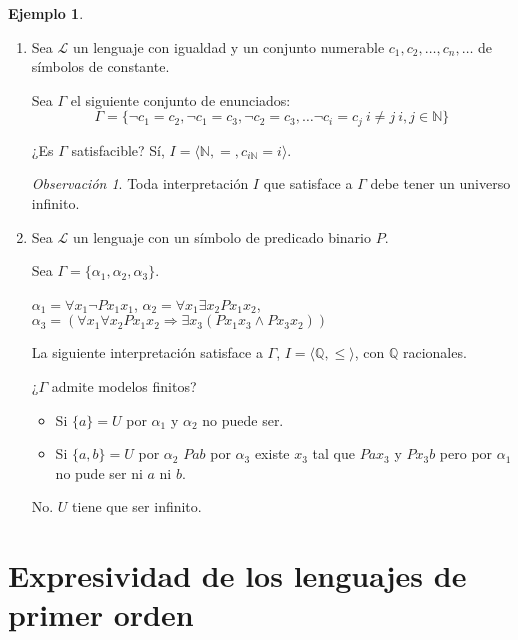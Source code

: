\documentclass[a4paper,11pt]{article}
\theoremstyle{definition}
\newtheorem{exap}{Ejemplo}[section]
\theoremstyle{remark}
\newtheorem*{remk}{Observación}
\def\NN{\mathbb{N}}
\def\QQ{\mathbb{Q}}
\def\LL{\ensuremath{\mathcal{L}}}
\begin{document}
\begin{exap}
    \begin{enumerate}
        \item Sea $\LL$ un lenguaje con igualdad y un conjunto numerable 
        $c_1, c_2, \dots, c_n, \dots$ de símbolos de constante.
     
        Sea $\Gamma$ el siguiente conjunto de enunciados:
        \[\Gamma = \{ 
            \lnot c_1 = c_2, \lnot c_1 = c_3, \lnot c_2 = c_3, \dots
            \lnot c_i = c_j\ i\neq j\ i,j \in \NN
        \}\]
     
        ¿Es $\Gamma$ satisfacible? Sí, 
        $I = \langle \NN, =, c_{i \NN} = i\rangle$.
     
        \begin{remk}
            Toda interpretación $I$ que satisface a $\Gamma$ debe
            tener un universo infinito.
        \end{remk}
     
        \item Sea $\LL$ un lenguaje con un símbolo de predicado binario $P$.
        
        Sea $\Gamma = \{\alpha_1, \alpha_2, \alpha_3\}$.
        
        $\alpha_1 = \forall x_1 \lnot P x_1 x_1$,
        $\alpha_2 = \forall x_1 \exists x_2 P x_1 x_2$,
        $\alpha_3 = (\forall x_1 \forall x_2 P x_1 x_2
            \Rightarrow \exists x_3 (P x_1 x_3 \land P x_3 x_2))$
            
        La siguiente interpretación satisface a $\Gamma$, 
        $I = \langle \QQ, \leq \rangle$, con $\QQ$ racionales.
        
        ¿$\Gamma$ admite modelos finitos? 
        
        \begin{itemize}
            \item Si $\{a\} = U$ por $\alpha_1$ y $\alpha_2$ no puede ser.
            
            \item Si $\{a, b\} = U$ por $\alpha_2$ $P a b$
            por $\alpha_3$ existe $x_3$ tal que $P a x_3$ y $P x_3 b$
            pero por $\alpha_1$ no pude ser ni $a$ ni $b$.
        \end{itemize}
        
        No. $U$ tiene que ser infinito.
    \end{enumerate}
\end{exap}

\section*{Expresividad de los lenguajes de primer orden}
\end{document}
